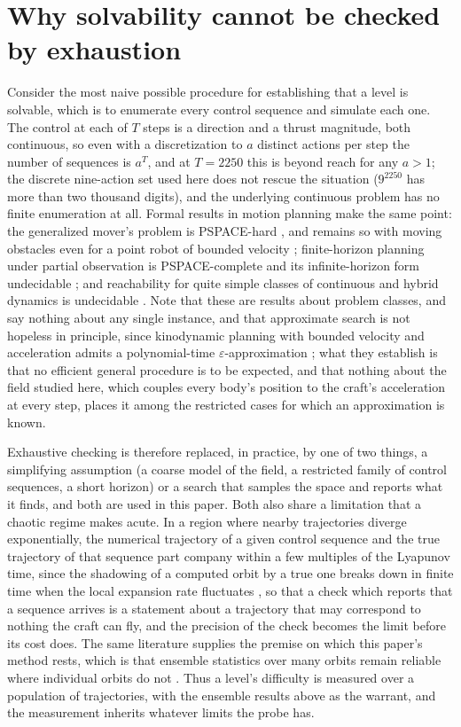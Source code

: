 \section{Why solvability cannot be checked by exhaustion}
\label{app:complexity}

Consider the most naive possible procedure for establishing that a level is
solvable, which is to enumerate every control sequence and simulate each
one. The control at each of $T$ steps is a direction and a thrust magnitude,
both continuous, so even with a discretization to $a$ distinct actions per
step the number of sequences is $a^T$, and at $T = 2250$ this is beyond
reach for any $a > 1$; the discrete nine-action set used here does not
rescue the situation ($9^{2250}$ has more than two thousand digits), and the
underlying continuous problem has no finite enumeration at all. Formal
results in motion planning make the same point: the generalized mover's
problem is PSPACE-hard \cite{reif1979,hopcroft1984,canny1988}, and remains
so with moving obstacles even for a point robot of bounded velocity
\cite{reif1994}; finite-horizon planning under partial observation is
PSPACE-complete and its infinite-horizon form undecidable
\cite{papadimitriou1987,madani2003}; and reachability for quite simple
classes of continuous and hybrid dynamics is undecidable
\cite{moore1990,henzinger1998,blondel2000}. Note that these are results
about problem classes, and say nothing about any single instance, and that
approximate search is not hopeless in principle, since kinodynamic planning
with bounded velocity and acceleration admits a polynomial-time
$\varepsilon$-approximation \cite{donald1993}; what they establish is that
no efficient general procedure is to be expected, and that nothing about
the field studied here, which couples every body's position to the craft's
acceleration at every step, places it among the restricted cases for which
an approximation is known.

Exhaustive checking is therefore replaced, in practice, by one of two
things, a simplifying assumption (a coarse model of the field, a restricted
family of control sequences, a short horizon) or a search that samples the
space and reports what it finds, and both are used in this paper. Both also
share a limitation that a chaotic regime makes acute. In a region where
nearby trajectories diverge exponentially, the numerical trajectory of a
given control sequence and the true trajectory of that sequence part company
within a few multiples of the Lyapunov time, since the shadowing of a
computed orbit by a true one breaks down in finite time when the local
expansion rate fluctuates \cite{hammel1987,sauer1997,sauer2002}, so that a
check which reports that a sequence arrives is a statement about a
trajectory that may correspond to nothing the craft can fly, and the precision of the check
becomes the limit before its cost does. The same literature supplies the
premise on which this paper's method rests, which is that ensemble
statistics over many orbits remain reliable where individual orbits do not
\cite{boekholt2015,portegieszwart2018}. Thus a level's difficulty is measured over a population of trajectories,
with the ensemble results above as the warrant, and the measurement
inherits whatever limits the probe has.
